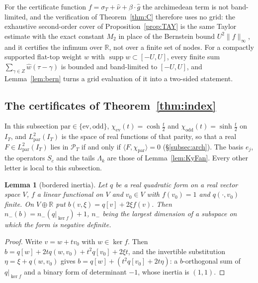 \documentclass[11pt]{amsart}
\newtheorem{lemma}[theorem]{Lemma}
\theoremstyle{definition}
\theoremstyle{remark}
\newcommand{\R}{\mathbb R}
\newcommand{\supp}{\operatorname{supp}}
\newcommand{\PT}{\mathcal P_T}
\newcommand{\IT}{I_T}
\newcommand{\sT}{\sigma_T}
\newcommand{\nuh}{\widehat\nu}
\newcommand{\wh}{\widehat w}
\begin{document}
For the certificate function $f=\sT+\nuh+\beta\cdot\widehat g$ the archimedean term is not
band-limited, and the verification of Theorem~\ref{thm:C} therefore uses no grid: the exhaustive
second-order cover of Proposition~\ref{prop:TAY} is the same Taylor estimate with the exact constant
$M_2$ in place of the Bernstein bound $U^2\|f\|_\infty$, and it certifies the infimum over $\R$, not over
a finite set of nodes. For a compactly supported flat-top weight $w$ with $\supp w\subset[-U,U]$,
every finite sum $\sum_{\gamma\in Z}\wh(\tau-\gamma)$ is bounded and band-limited to $[-U,U]$, and
Lemma~\ref{lem:bern} turns a grid evaluation of it into a two-sided statement.

\subsection{The certificates of Theorem~\ref{thm:index}}\label{subsec:enclindex}
In this subsection $\mathrm{par}\in\{\mathrm{ev},\mathrm{odd}\}$, $\chi_{\mathrm{ev}}(t)=\cosh\frac t2$ and
$\chi_{\mathrm{odd}}(t)=\sinh\frac t2$ on $\IT$, and $L^2_{\mathrm{par}}(\IT)$ is the space of real functions
of that parity, so that a real $F\in L^2_{\mathrm{par}}(\IT)$ lies in $\PT$ if and only if
$\langle F,\chi_{\mathrm{par}}\rangle=0$ (\S\ref{subsec:arch}). The basis $e_j$, the operators $S_c$ and the
tails $\Lambda_k$ are those of Lemma~\ref{lem:KyFan}. Every other letter is local to this subsection.

\begin{lemma}[bordered inertia]\label{lem:border}
Let $q$ be a real quadratic form on a real vector space $V$, $f$ a linear functional on
$V$ and $v_0\in V$ with $f(v_0)=1$ and $q(\cdot,v_0)$ finite. On $V\oplus\R$ put
$b(v,\xi)=q[v]+2\xi f(v)$. Then $n_-(b)=n_-(q|_{\ker f})+1$, $n_-$ being the largest dimension of a
subspace on which the form is negative definite.
\end{lemma}
\begin{proof}
Write $v=w+tv_0$ with $w\in\ker f$. Then $b=q[w]+2tq(w,v_0)+t^2q[v_0]+2\xi t$, and the invertible
substitution $\eta=\xi+q(w,v_0)$ gives $b=q[w]+(t^2q[v_0]+2t\eta)$: a $b$-orthogonal sum of
$q|_{\ker f}$ and a binary form of determinant $-1$, whose inertia is $(1,1)$.
\end{proof}
\end{document}
